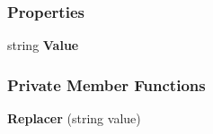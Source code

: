 \subsubsection*{Properties}
\begin{DoxyCompactItemize}
\item 
\mbox{\label{classHighcharts_1_1Replacer_af7b88db799d8f791f785e437bc6099d2}} 
string {\bfseries Value}
\end{DoxyCompactItemize}
\subsubsection*{Private Member Functions}
\begin{DoxyCompactItemize}
\item 
\mbox{\label{classHighcharts_1_1Replacer_aad10b0644e2d606c7208a4600476be8b}} 
{\bfseries Replacer} (string value)
\end{DoxyCompactItemize}
